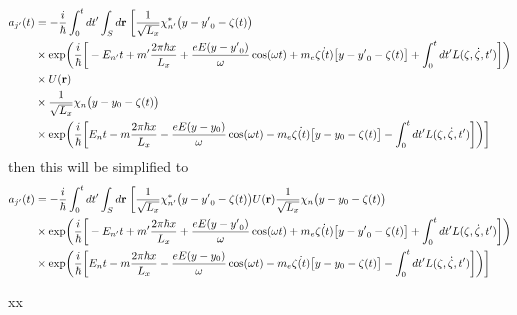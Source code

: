 \begin{equation} \label{2.13}
  \begin{aligned}
    a_{j'}(t) & =
   -\frac{i}{\hbar}
   \int_0^t dt' \int_S d\vb{r} \;
   \bigg[
   \frac{1}{\sqrt{L_x}} \chi_{n'}^*\big(y - {y'}_0 -\zeta(t)\big) \\
   & \times
     \exp(
    \frac{i}{\hbar}\bigg[- E_{n'}t + m'\frac{2\pi \hbar x}{L_x} +
   \frac{eE(y-{y'}_0)}{\omega}\cos(\omega t)+
   m_e\dot{\zeta(t)}\big[y - {y'}_0 -\zeta(t)\big]
    + \int_0^{t}dt'L(\zeta,\dot{\zeta},t')\bigg]) \\
    & \times
    U(\vb{r}) \\
    & \times
    \frac{1}{\sqrt{L_x}} \chi_{n}\big(y - y_0 -\zeta(t)\big) \\
    & \times
      \exp(
     \frac{i}{\hbar}\bigg[ E_{n}t - m\frac{2\pi \hbar x}{L_x} -
    \frac{eE(y-y_0)}{\omega}\cos(\omega t) -
    m_e\dot{\zeta(t)}\big[y - y_0 -\zeta(t)\big]
     - \int_0^{t}dt'L(\zeta,\dot{\zeta},t')\bigg])
    \bigg]
  \end{aligned}
\end{equation}
then this will be simplified to
\begin{equation} \label{2.14}
  \begin{aligned}
    a_{j'}(t) & =
   -\frac{i}{\hbar}
   \int_0^t dt' \int_S d\vb{r} \;
   \bigg[
   \frac{1}{\sqrt{L_x}} \chi_{n'}^*\big(y - {y'}_0 -\zeta(t)\big)
   U(\vb{r})
   \frac{1}{\sqrt{L_x}} \chi_{n}\big(y - y_0 -\zeta(t)\big)  \\
   & \times
     \exp(
    \frac{i}{\hbar}\bigg[- E_{n'}t + m'\frac{2\pi \hbar x}{L_x} +
   \frac{eE(y-{y'}_0)}{\omega}\cos(\omega t)+
   m_e\dot{\zeta(t)}\big[y - {y'}_0 -\zeta(t)\big]
    + \int_0^{t}dt'L(\zeta,\dot{\zeta},t')\bigg]) \\
    & \times
      \exp(
     \frac{i}{\hbar}\bigg[ E_{n}t - m\frac{2\pi \hbar x}{L_x} -
    \frac{eE(y-y_0)}{\omega}\cos(\omega t) -
    m_e\dot{\zeta(t)}\big[y - y_0 -\zeta(t)\big]
     - \int_0^{t}dt'L(\zeta,\dot{\zeta},t')\bigg])
    \bigg]
  \end{aligned}
\end{equation}


































xx
